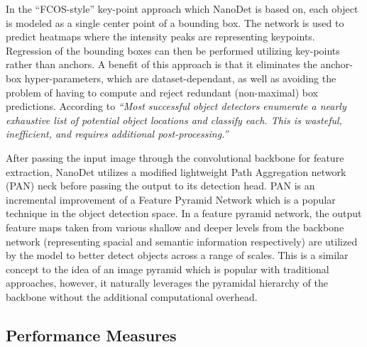 \documentclass[a4paper,twoside,12pt]{report}
\begin{document}
In the ``FCOS-style'' key-point approach which NanoDet is based on, each object is modeled as a single center point of a bounding box. The network is used to predict heatmaps where the intensity peaks are representing keypoints. Regression of the bounding boxes can then be performed utilizing key-points rather than anchors. A benefit of this approach is that it eliminates the anchor-box hyper-parameters, which are dataset-dependant, as well as avoiding the problem of having to compute and reject redundant (non-maximal) box predictions. According to \cite{cnet} \textit{``Most successful object detectors enumerate a nearly exhaustive list of potential object locations and classify each. This is wasteful, inefficient, and requires additional post-processing.''}   

After passing the input image through the convolutional backbone for feature extraction, NanoDet utilizes a modified lightweight Path Aggregation network (PAN) \citep{pan, nanodet} neck before passing the output to its detection head. PAN is an incremental improvement of a Feature Pyramid Network \citep{fpn} which is a popular technique in the object detection space. In a feature pyramid network, the output feature maps taken from various shallow and deeper levels from the backbone network (representing spacial and semantic information respectively) are utilized by the model to better detect objects across a range of scales. This is a similar concept to the idea of an image pyramid which is popular with traditional approaches, however, it naturally leverages the pyramidal hierarchy of the backbone without the additional computational overhead.

\subsection{Performance Measures}
\end{document}
